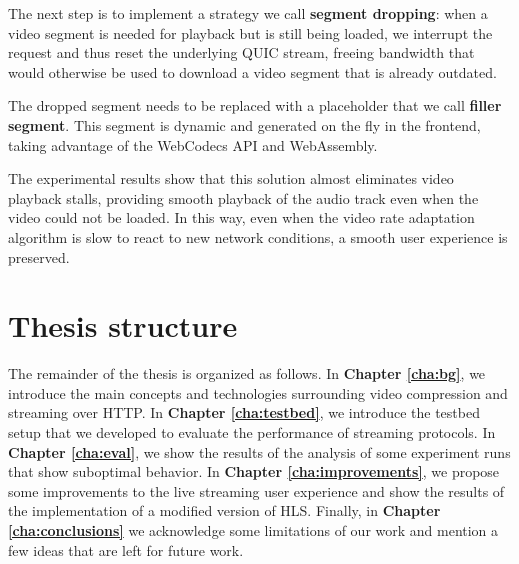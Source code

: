 The next step is to implement a strategy we call \textbf{segment dropping}: when a video segment is needed for playback but is still being loaded, we interrupt the request and thus reset the underlying QUIC stream, freeing bandwidth that would otherwise be used to download a video segment that is already outdated.

The dropped segment needs to be replaced with a placeholder that we call \textbf{filler segment}. This segment is dynamic and generated on the fly in the frontend, taking advantage of the WebCodecs API and WebAssembly.

The experimental results show that this solution almost eliminates video playback stalls, providing smooth playback of the audio track even when the video could not be loaded. In this way, even when the video rate adaptation algorithm is slow to react to new network conditions, a smooth user experience is preserved.

\section{Thesis structure}
\label{sec:intro/structure}

The remainder of the thesis is organized as follows. In \textbf{Chapter \ref{cha:bg}}, we introduce the main concepts and technologies surrounding video compression and streaming over HTTP. In \textbf{Chapter \ref{cha:testbed}}, we introduce the testbed setup that we developed to evaluate the performance of streaming protocols. In \textbf{Chapter \ref{cha:eval}}, we show the results of the analysis of some experiment runs that show suboptimal behavior. In \textbf{Chapter \ref{cha:improvements}}, we propose some improvements to the live streaming user experience and show the results of the implementation of a modified version of HLS. Finally, in \textbf{Chapter \ref{cha:conclusions}} we acknowledge some limitations of our work and mention a few ideas that are left for future work.

